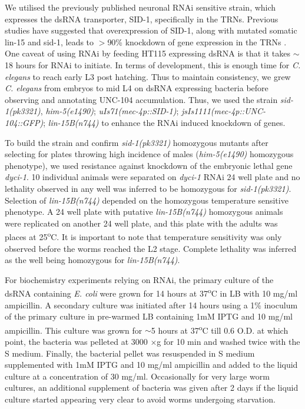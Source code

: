We utilised the previously published neuronal RNAi sensitive strain, which expresses the dsRNA transporter, SID-1, specifically in the TRNs. Previous studies have suggested that overexpression of SID-1, along with mutated somatic lin-15 and sid-1, leads to $>$90\% knockdown of gene expression in the TRNs \parencite{calixto2010}. One caveat of using RNAi by feeding HT115 expressing dsRNA is that it takes $\sim$18 hours for RNAi to initiate. In terms of development, this is enough time for \textit{C. elegans} to reach early L3 post hatching. Thus to maintain consistency, we grew \textit{C. elegans} from embryos to mid L4 on dsRNA expressing bacteria before observing and annotating UNC-104 accumulation. Thus, we used the strain \textit{sid-1(pk3321)}, \textit{him-5(e1490)}; \textit{uIs71(mec-4p::SID-1)}; \textit{jsIs1111(mec-4p::UNC-104::GFP)}; \textit{lin-15B(n744)} to enhance the RNAi induced knockdown of genes. 

To build the strain and confirm \textit{sid-1(pk3321)} homozygous mutants after selecting for plates throwing high incidence of males (\textit{him-5(e1490)} homozygous phenotype), we used resistance against knockdown of the embryonic lethal gene \textit{dyci-1}. 10 individual animals were separated on \textit{dyci-1} RNAi 24 well plate and no lethality observed in any well was inferred to be homozygous for \textit{sid-1(pk3321)}. Selection of \textit{lin-15B(n744)} depended on the homozygous temperature sensitive phenotype. A 24 well plate with putative \textit{lin-15B(n744)} homozygous animals were replicated on another 24 well plate, and this plate with the adults was places at 25\textsuperscript{o}C. It is important to note that temperature sensitivity was only observed before the worms reached the L2 stage. Complete lethality was inferred as the well being homozygous for \textit{lin-15B(n744)}.

For biochemistry experiments relying on RNAi, the primary culture of the dsRNA containing \textit{E. coli} were grown for 14 hours at 37\textsuperscript{o}C in LB with 10 mg/ml ampicillin. A secondary culture was initiated after 14 hours using a 1\% inoculum of the primary culture in pre-warmed LB containing 1mM IPTG and 10 mg/ml ampicillin. This culture was grown for $\sim$5 hours at 37\textsuperscript{o}C till 0.6 O.D. at which point, the bacteria was pelleted at 3000 $\times$g for 10 min and washed twice with the S medium. Finally, the bacterial pellet was resuspended in S medium supplemented with 1mM IPTG and 10 mg/ml ampicillin and added to the liquid culture at a concentration of 30 mg/ml. Occasionally for very large worm cultures, an additional supplement of bacteria was given after 2 days if the liquid culture started appearing very clear to avoid worms undergoing starvation.

